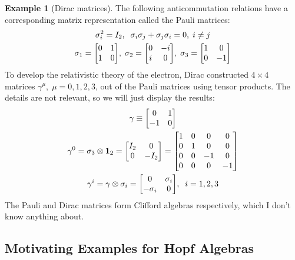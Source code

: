\documentclass{article}
\theoremstyle{definition}
\newtheorem*{Example*}{Example}
\theoremstyle{remark}
\theoremstyle{underline}
\theoremstyle{underline}
\begin{document}
\begin{Example*}[Dirac matrices]
The following anticommutation relations have a corresponding matrix representation called the Pauli matrices:
\begin{gather}
	\sigma_i^2 = I_2, \;\; \sigma_i \sigma_j + \sigma_j\sigma_i = 0, \; i \neq j \\
	\sigma_1 = \mqty[0 & 1 \\ 1 & 0],\; \sigma_2 = \mqty[0 & -i \\ i & 0],\; \sigma_3 = \mqty[1 & 0 \\ 0 & -1]
\end{gather}
To develop the relativistic theory of the electron, Dirac constructed $4 \times 4$ matrices $\gamma^\mu,\; \mu = 0,1,2,3$, out of the Pauli matrices using tensor products. The details are not relevant, so we will just display the results:
\begin{gather}
	\gamma \equiv \mqty[0 & 1 \\ -1 & 0] \\
	\gamma^{0} = \sigma_3 \otimes \mathbf 1_2 = \mqty[I_2 & 0 \\ 0 & -I_2] = \mqty[1 & 0 & 0 & 0 \\ 0 & 1 & 0 & 0 \\ 0 & 0 & -1 & 0 \\ 0 & 0 & 0 & -1] \\
	\gamma^{i} = \gamma \otimes \sigma_i = \mqty[0 & \sigma_i \\ -\sigma_i & 0],\;\; i = 1,2,3
\end{gather}
The Pauli and Dirac matrices form Clifford algebras respectively, which I don't know anything about.
\end{Example*}

\subsection{Motivating Examples for Hopf Algebras}
\end{document}

